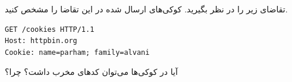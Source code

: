 

تقاضای زیر را در نظر بگیرید. کوکی‌های ارسال شده در این تقاضا را مشخص کنید.

\begin{latin}
\begin{verbatim}
GET /cookies HTTP/1.1
Host: httpbin.org
Cookie: name=parham; family=alvani
\end{verbatim}
\end{latin}

آیا در کوکی‌ها می‌توان کدهای مخرب داشت؟ چرا؟


